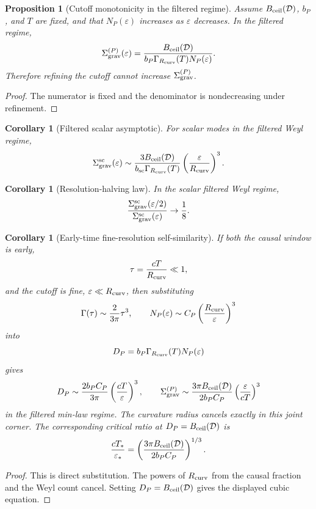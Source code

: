 \documentclass[11pt,a4paper]{article}
\newtheorem{proposition}[theorem]{Proposition}
\newtheorem{corollary}[theorem]{Corollary}
\begin{document}
\begin{proposition}[Cutoff monotonicity in the filtered regime]
Assume $B_{\rm ceil}(\mathcal D)$, $b_P$, and $T$ are fixed, and that $N_P(\varepsilon)$ increases as $\varepsilon$ decreases.  In the filtered regime,
\[
\Sigma_{\rm grav}^{(P)}(\varepsilon)
=
\frac{B_{\rm ceil}(\mathcal D)}
{b_P\Gamma_{R_{\rm curv}}(T)N_P(\varepsilon)}.
\]
Therefore refining the cutoff cannot increase $\Sigma_{\rm grav}^{(P)}$.
\end{proposition}
\begin{proof}
The numerator is fixed and the denominator is nondecreasing under refinement.
\end{proof}

\begin{corollary}[Filtered scalar asymptotic]
For scalar modes in the filtered Weyl regime,
\[
\Sigma_{\rm grav}^{\rm sc}(\varepsilon)
\sim
\frac{3B_{\rm ceil}(\mathcal D)}
{b_{\rm sc}\Gamma_{R_{\rm curv}}(T)}
\left(\frac{\varepsilon}{R_{\rm curv}}\right)^3.
\]
\end{corollary}

\begin{corollary}[Resolution-halving law]
In the scalar filtered Weyl regime,
\[
\frac{\Sigma_{\rm grav}^{\rm sc}(\varepsilon/2)}
{\Sigma_{\rm grav}^{\rm sc}(\varepsilon)}
\to
\frac18.
\]
\end{corollary}

\begin{corollary}[Early-time fine-resolution self-similarity]
\label{cor:double-asymptotic}
If both the causal window is early,
\[
\tau=\frac{cT}{R_{\rm curv}}\ll1,
\]
and the cutoff is fine, $\varepsilon\ll R_{\rm curv}$, then substituting
\[
\Gamma(\tau)\sim\frac{2}{3\pi}\tau^3,
\qquad
N_P(\varepsilon)\sim C_P\left(\frac{R_{\rm curv}}{\varepsilon}\right)^3
\]
into
\[
D_P=b_P\Gamma_{R_{\rm curv}}(T)N_P(\varepsilon)
\]
gives
\[
D_P\sim
\frac{2b_PC_P}{3\pi}
\left(\frac{cT}{\varepsilon}\right)^3,
\qquad
\Sigma_{\rm grav}^{(P)}
\sim
\frac{3\pi B_{\rm ceil}(\mathcal D)}
{2b_PC_P}
\left(\frac{\varepsilon}{cT}\right)^3
\]
in the filtered min-law regime.  The curvature radius cancels exactly in this joint corner.  The corresponding critical ratio at $D_P=B_{\rm ceil}(\mathcal D)$ is
\[
\frac{cT_*}{\varepsilon_*}
=
\left(
\frac{3\pi B_{\rm ceil}(\mathcal D)}
{2b_PC_P}
\right)^{1/3}.
\]
\end{corollary}
\begin{proof}
This is direct substitution.  The powers of $R_{\rm curv}$ from the causal fraction and the Weyl count cancel.  Setting $D_P=B_{\rm ceil}(\mathcal D)$ gives the displayed cubic equation.
\end{proof}
\end{document}
